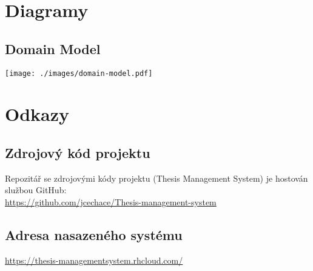 \documentclass[11pt,oneside]{fithesis2}
\begin{document}
\chapter{Diagramy}

\section{Domain Model}
\texttt{[image: ./images/domain-model.pdf]}

\chapter{Odkazy}

\section{Zdrojový kód projektu}
Repozitář se zdrojovými kódy projektu (Thesis Management System) je hostován službou GitHub:\\
\url{https://github.com/jcechace/Thesis-management-system}

\section{Adresa nasazeného systému}
\url{https://thesis-managementsystem.rhcloud.com/}
\end{document}
